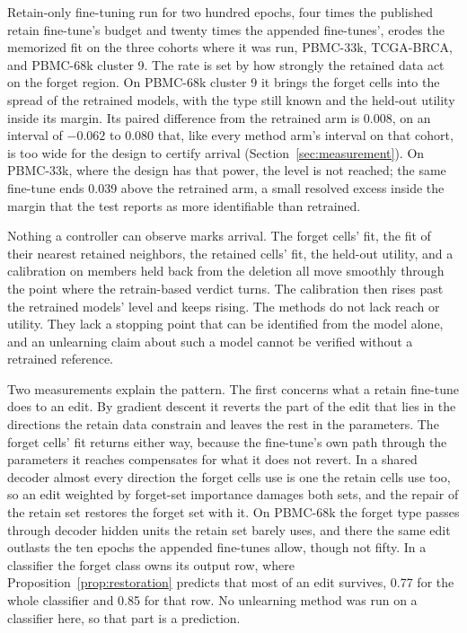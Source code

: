 \documentclass{article}
\begin{document}
Retain-only fine-tuning run for two hundred epochs, four times the published retain fine-tune's budget and twenty times the appended fine-tunes', erodes the memorized fit on the three cohorts where it was run, PBMC-33k, TCGA-BRCA, and PBMC-68k cluster 9. The rate is set by how strongly the retained data act on the forget region. On PBMC-68k cluster 9 it brings the forget cells into the spread of the retrained models, with the type still known and the held-out utility inside its margin. Its paired difference from the retrained arm is 0.008, on an interval of $-0.062$ to 0.080 that, like every method arm's interval on that cohort, is too wide for the design to certify arrival (Section~\ref{sec:measurement}). On PBMC-33k, where the design has that power, the level is not reached; the same fine-tune ends 0.039 above the retrained arm, a small resolved excess inside the margin that the test reports as more identifiable than retrained.

Nothing a controller can observe marks arrival. The forget cells' fit, the fit of their nearest retained neighbors, the retained cells' fit, the held-out utility, and a calibration on members held back from the deletion all move smoothly through the point where the retrain-based verdict turns. The calibration then rises past the retrained models' level and keeps rising. The methods do not lack reach or utility. They lack a stopping point that can be identified from the model alone, and an unlearning claim about such a model cannot be verified without a retrained reference.

Two measurements explain the pattern. The first concerns what a retain fine-tune does to an edit. By gradient descent it reverts the part of the edit that lies in the directions the retain data constrain and leaves the rest in the parameters. The forget cells' fit returns either way, because the fine-tune's own path through the parameters it reaches compensates for what it does not revert. In a shared decoder almost every direction the forget cells use is one the retain cells use too, so an edit weighted by forget-set importance damages both sets, and the repair of the retain set restores the forget set with it. On PBMC-68k the forget type passes through decoder hidden units the retain set barely uses, and there the same edit outlasts the ten epochs the appended fine-tunes allow, though not fifty. In a classifier the forget class owns its output row, where Proposition~\ref{prop:restoration} predicts that most of an edit survives, 0.77 for the whole classifier and 0.85 for that row. No unlearning method was run on a classifier here, so that part is a prediction.
\end{document}
